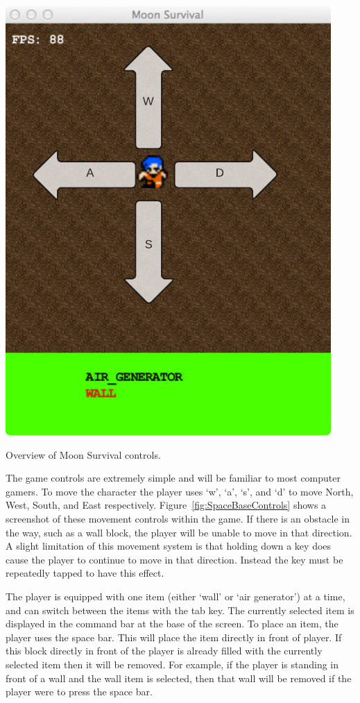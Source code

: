 \begin{marginfigure}
	\includegraphics{res/space_base_prototype/MoonSurvivalControls.pdf}
	\caption[Moon Survival controls]{Overview of Moon Survival controls.}
	\label{fig:SpaceBaseControls}
\end{marginfigure}

The game controls are extremely simple and will be familiar to most computer gamers. To move the character the player uses `w', `a', `s', and `d' to move North, West, South, and East respectively. Figure~\ref{fig:SpaceBaseControls} shows a screenshot of these movement controls within the game. If there is an obstacle in the way, such as a wall block, the player will be unable to move in that direction. A slight limitation of this movement system is that holding down a key does cause the player to continue to move in that direction. Instead the key must be repeatedly tapped to have this effect.

The player is equipped with one item (either `wall' or `air generator') at a time, and can switch between the items with the tab key. The currently selected item is displayed in the command bar at the base of the screen. To place an item, the player uses the space bar. This will place the item directly in front of player. If this block directly in front of the player is already filled with the currently selected item then it will be removed. For example, if the player is standing in front of a wall and the wall item is selected, then that wall will be removed if the player were to press the space bar.

